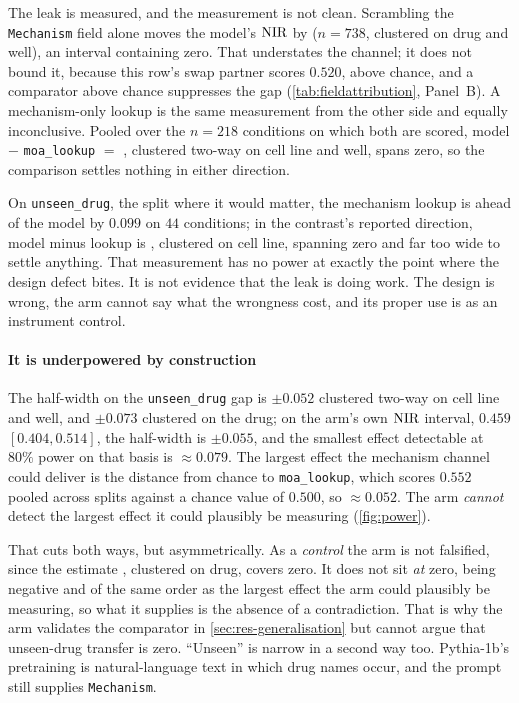 The leak is measured, and the measurement is not clean. Scrambling the
\texttt{Mechanism} field alone moves the model's $\textrm{NIR}$ by
 ($n = \num{738}$, clustered on drug and well), an
interval containing zero. That understates the channel; it does not bound it,
because this row's swap partner scores $0.520$, above chance, and a comparator
above chance suppresses the gap (\cref{tab:fieldattribution}, Panel~B). A
mechanism-only lookup is the same measurement from the other side and equally
inconclusive. Pooled over the $n = \num{218}$ conditions on which both are
scored, model $-$ \texttt{moa\_lookup} $=$ ,
clustered two-way on cell line and well, spans zero, so the comparison settles
nothing in either direction.

On \texttt{unseen\_drug}, the split where it would matter, the mechanism lookup
is ahead of the model by $0.099$ on $44$ conditions; in the contrast's reported
direction, model minus lookup is , clustered on cell
line, spanning zero and far too wide to settle anything. That measurement has no
power at exactly the point where the design defect bites. It is not evidence
that the leak is doing work. The design is wrong, the arm cannot say what the
wrongness cost, and its proper use is as an instrument control.

\paragraph{It is underpowered by construction} The half-width on the
\texttt{unseen\_drug} gap is $\pm 0.052$ clustered two-way on cell line and
well, and $\pm 0.073$ clustered on the drug; on the arm's own $\textrm{NIR}$ interval, $0.459$ $[0.404, 0.514]$, the half-width is $\pm 0.055$, and the smallest effect detectable at $80\%$ power on that basis is $\approx 0.079$. The largest effect the mechanism channel could
deliver is the distance from chance to \texttt{moa\_lookup}, which scores
$0.552$ pooled across splits against a chance value of $0.500$, so $\approx
0.052$. The arm \emph{cannot} detect the largest effect it could plausibly be
measuring (\cref{fig:power}).



That cuts both ways, but asymmetrically. As a \emph{control} the arm is not
falsified, since the estimate , clustered on drug,
covers zero. It does not sit \emph{at} zero, being negative and of the same
order as the largest effect the arm could plausibly be measuring, so what it
supplies is the absence of a contradiction. That is why the arm validates the
comparator in \cref{sec:res-generalisation} but cannot argue that unseen-drug
transfer is zero. ``Unseen'' is narrow in a second way too. Pythia-1b's
pretraining is natural-language text in which drug names occur, and the
prompt still supplies \texttt{Mechanism}.

